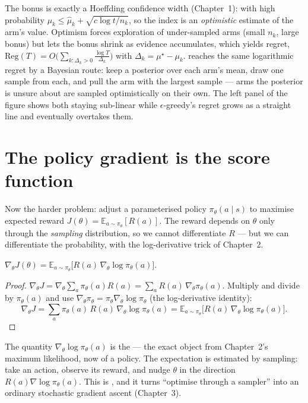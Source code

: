 \documentclass[11pt]{article}
\begin{document}
The bonus is exactly a Hoeffding confidence width (Chapter~1): with high
probability $\mu_k\le\hat\mu_k+\sqrt{c\log t/n_k}$, so the index is an
\emph{optimistic} estimate of the arm's value. Optimism forces exploration of
under-sampled arms (small $n_k$, large bonus) but lets the bonus shrink as
evidence accumulates, which yields  regret,
$\mathrm{Reg}(T)=O\!\big(\sum_{k:\Delta_k>0}\tfrac{\log T}{\Delta_k}\big)$ with
$\Delta_k=\mu^\star-\mu_k$.  reaches the same
logarithmic regret by a Bayesian route: keep a posterior over each arm's mean,
draw one sample from each, and pull the arm with the largest sample --- arms the
posterior is unsure about are sampled optimistically on their own. The left panel
of the figure shows both staying sub-linear while $\epsilon$-greedy's regret grows
as a straight line and eventually overtakes them.

\section{The policy gradient is the score function}

Now the harder problem: adjust a parameterised policy $\pi_\theta(a\mid s)$ to
maximise expected reward $J(\theta)=\mathbb{E}_{a\sim\pi_\theta}[R(a)]$. The reward
depends on $\theta$ only through the \emph{sampling} distribution, so we cannot
differentiate $R$ --- but we can differentiate the probability, with the
log-derivative trick of Chapter~2.

\begin{theorem}
$\displaystyle \nabla_\theta J(\theta)
 = \mathbb{E}_{a\sim\pi_\theta}\!\big[R(a)\,\nabla_\theta\log\pi_\theta(a)\big].$
\end{theorem}
\begin{proof}
$\nabla_\theta J = \nabla_\theta\sum_a \pi_\theta(a)R(a)
 = \sum_a R(a)\,\nabla_\theta\pi_\theta(a)$. Multiply and divide by
$\pi_\theta(a)$ and use $\nabla_\theta\pi_\theta=\pi_\theta\nabla_\theta\log\pi_\theta$
(the log-derivative identity):
\[
  \nabla_\theta J = \sum_a \pi_\theta(a)\,R(a)\,\nabla_\theta\log\pi_\theta(a)
   = \mathbb{E}_{a\sim\pi_\theta}\big[R(a)\,\nabla_\theta\log\pi_\theta(a)\big].
\]
\end{proof}

The quantity $\nabla_\theta\log\pi_\theta(a)$ is the  --- the exact
object from Chapter~2's maximum likelihood, now of a policy. The expectation is
estimated by sampling: take an action, observe its reward, and nudge $\theta$ in
the direction $R(a)\nabla\log\pi_\theta(a)$. This is , and it
turns ``optimise through a sampler'' into an ordinary stochastic gradient ascent
(Chapter~3).
\end{document}
